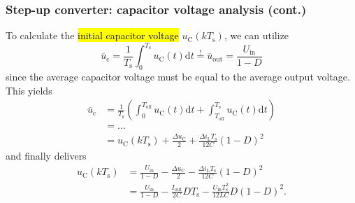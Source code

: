 \begin{frame}
    \frametitle{Step-up converter: capacitor voltage analysis (cont.)}
    To calculate the \hl{initial capacitor voltage} $u_\mathrm{C}(kT_\mathrm{s})$, we can utilize
    \begin{equation}
        \overline{u}_\mathrm{c} = \frac{1}{T_\mathrm{s}}\int_0^{T_\mathrm{s}} u_\mathrm{C}(t) \mathrm{d}t   \stackrel{!}{=} \overline{u}_\mathrm{out} = \frac{U_\mathrm{in}}{1-D}
        \label{eq:capacitor-voltage-average-step-up-converter}
    \end{equation}
    since the average capacitor voltage must be equal to the average output voltage. This yields
    \begin{equation}
        \begin{split}
            \overline{u}_\mathrm{c} &=  \frac{1}{T_\mathrm{s}}\left(\int_0^{T_\mathrm{off}} u_\mathrm{C}(t) \mathrm{d}t + \int_{T_\mathrm{off}}^{T_\mathrm{s}} u_\mathrm{C}(t) \mathrm{d}t\right)  \\
                                    &=\ldots\\
                                    &=u_\mathrm{C}(kT_\mathrm{s}) + \frac{\Delta u_\mathrm{C}}{2} +\frac{\Delta i_\mathrm{L}T_\mathrm{s}}{12C}(1-D)^2 
        \end{split}
    \end{equation}
    and finally delivers
    \begin{equation}
        \begin{split}
            u_\mathrm{C}(kT_\mathrm{s}) &= \frac{U_\mathrm{in}}{1-D} - \frac{\Delta u_\mathrm{C}}{2} -\frac{\Delta i_\mathrm{L}T_\mathrm{s}}{12C}(1-D)^2\\
                                        &= \frac{U_\mathrm{in}}{1-D} - \frac{I_\mathrm{out}}{2C}DT_\mathrm{s} -\frac{U_\mathrm{in}T^2_\mathrm{s}}{12LC}D(1-D)^2.
        \end{split}
    \end{equation}
\end{frame}


